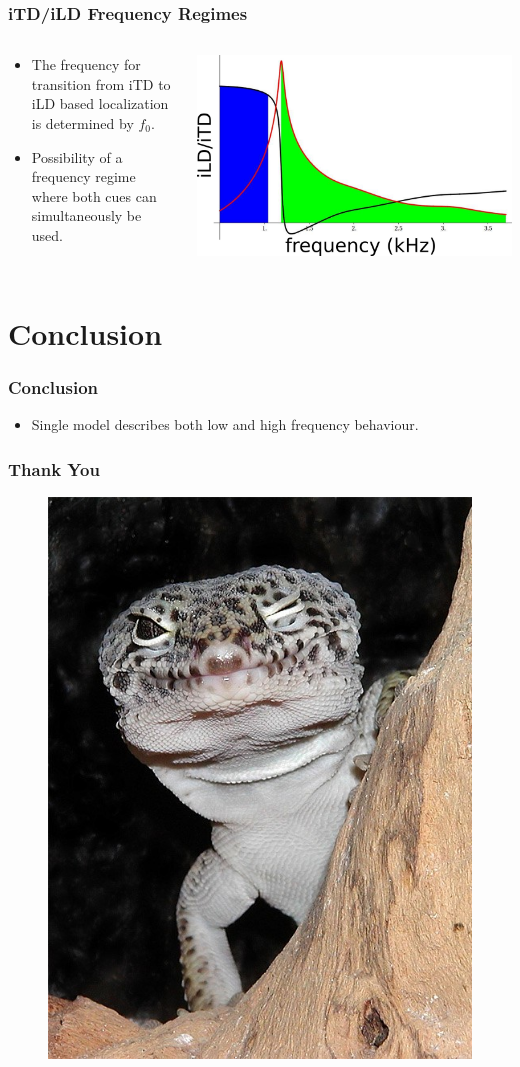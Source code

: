 \documentclass{beamer}
\begin{document}
\begin{frame}
\frametitle{iTD/iLD Frequency Regimes}
\begin{columns}
\begin{column}{0.5\textwidth}
\begin{exampleblock}{}
\small
 \begin{itemize}
  \item The frequency for transition from iTD to iLD based localization is determined by $f_0$.
  \item Possibility of a frequency regime where both cues can simultaneously be used.
 \end{itemize}
\end{exampleblock}
\end{column}
     \begin{column}{0.5\textwidth}
      \includegraphics[width = 6 cm]{Diagrams/Presentation/tokayregions.png}
\end{column}
\end{columns}
\end{frame}

\section{Conclusion}
\begin{frame}[t]
 \frametitle{Conclusion}
 \begin{exampleblock}{}
 \begin{itemize}
  \item Single model describes both low and high frequency behaviour.
 \end{itemize}
\end{exampleblock}
\end{frame}

\begin{frame}[t]
 \frametitle{Thank You}
 \begin{figure}
  \centering
  \includegraphics[width=.3\textwidth]{Diagrams/geckowink.jpg}
 \end{figure}
\end{frame}
\end{document}
